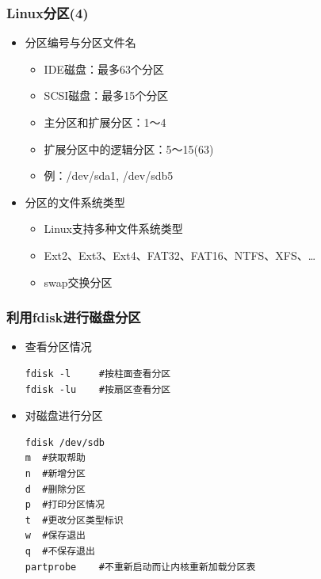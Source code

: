 \documentclass[xcolor=svgnames,presentation]{beamer}
\begin{document}
\begin{frame}
\frametitle{Linux分区(4)}
\label{sec-1-6}
\begin{itemize}

\item 分区编号与分区文件名
\label{sec-1-6-1}%
\begin{itemize}

\item IDE磁盘：最多63个分区
\label{sec-1-6-1-1}%

\item SCSI磁盘：最多15个分区
\label{sec-1-6-1-2}%

\item 主分区和扩展分区：1～4
\label{sec-1-6-1-3}%

\item 扩展分区中的逻辑分区：5～15(63)
\label{sec-1-6-1-4}%

\item 例：/dev/sda1, /dev/sdb5
\label{sec-1-6-1-5}%
\end{itemize} %

\item 分区的文件系统类型
\label{sec-1-6-2}%
\begin{itemize}

\item Linux支持多种文件系统类型
\label{sec-1-6-2-1}%

\item Ext2、Ext3、Ext4、FAT32、FAT16、NTFS、XFS、\ldots{}
\label{sec-1-6-2-2}%

\item swap交换分区
\label{sec-1-6-2-3}%
\end{itemize} %
\end{itemize} %
\end{frame}
\begin{frame}[fragile]
\frametitle{利用fdisk进行磁盘分区}
\label{sec-1-7}
\begin{itemize}

\item 查看分区情况\\
\label{sec-1-7-1}%
\begin{verbatim}
fdisk -l     #按柱面查看分区
fdisk -lu    #按扇区查看分区
\end{verbatim}

\item 对磁盘进行分区\\
\label{sec-1-7-2}%
\begin{verbatim}
fdisk /dev/sdb
m  #获取帮助
n  #新增分区
d  #删除分区
p  #打印分区情况
t  #更改分区类型标识
w  #保存退出
q  #不保存退出
partprobe    #不重新启动而让内核重新加载分区表
\end{verbatim}
\end{itemize} %
\end{frame}
\end{document}
